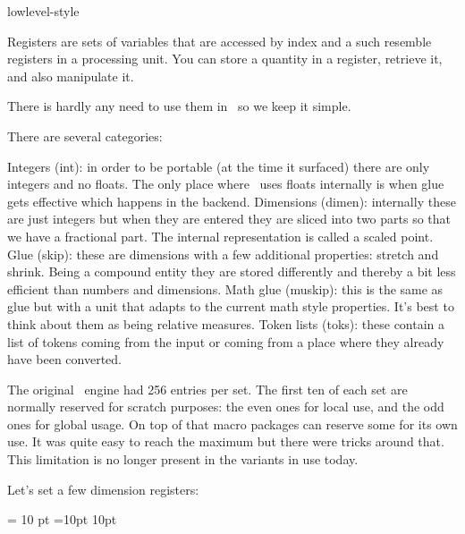 
\environment lowlevel-style

\startdocument
  [title=registers,
   color=darkmagenta]

\startsectionlevel[title=Preamble]

Registers are sets of variables that are accessed by index and a such resemble
registers in a processing unit. You can store a quantity in a register, retrieve
it, and also manipulate it.

There is hardly any need to use them in \CONTEXT\ so we keep it simple.

\stopsectionlevel

\startsectionlevel[title={\TEX\ primitives}]

There are several categories:

\startitemize
\startitem
    Integers (int): in order to be portable (at the time it surfaced) there are only
    integers and no floats. The only place where \TEX\ uses floats internally is
    when glue gets effective which happens in the backend.
\stopitem
\startitem
    Dimensions (dimen): internally these are just integers but when they are entered they
    are sliced into two parts so that we have a fractional part. The internal
    representation is called a scaled point.
\stopitem
\startitem
    Glue (skip): these are dimensions with a few additional properties: stretch and
    shrink. Being a compound entity they are stored differently and thereby a bit
    less efficient than numbers and dimensions.
\stopitem
\startitem
    Math glue (muskip): this is the same as glue but with a unit that adapts to
    the current math style properties. It's best to think about them as being
    relative measures.
\stopitem
\startitem
    Token lists (toks): these contain a list of tokens coming from the input
    or coming from a place where they already have been converted.
\stopitem
\stopitemize

The original \TEX\ engine had 256 entries per set. The first ten of each set are
normally reserved for scratch purposes: the even ones for local use, and the odd
ones for global usage. On top of that macro packages can reserve some for its own
use. It was quite easy to reach the maximum but there were tricks around that.
This limitation is no longer present in the variants in use today.

Let's set a few dimension registers:

\startbuffer[1]
 = 10 pt
=10pt
 10pt
\scratchdimen 10pt
\stopbuffer

